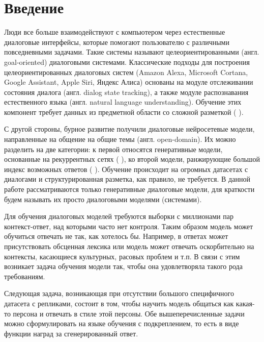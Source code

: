 \documentclass[12pt,a4paper]{amsart}
\begin{document}
\pagebreak
\section{Введение}

Люди все больше взаимодействуют с компьютером через естественные диалоговые интерфейсы, которые помогают пользователю с различными повседневными задачами. Такие системы называют целеориентированными (англ. goal-oriented) диалоговыми системами. Классические подходы для построения целеориентированных диалоговых систем (Amazon Alexa, Microsoft Cortana, Google Assistant, Apple Siri, Яндекс Алиса) основаны на модуле отслеживании состояния диалога (англ. dialog state tracking), а также модуле распознавания естественного языка (англ. natural language understanding). Обучение этих компонент требует данных из предметной области со сложной разметкой (\cite{DBLP:journals/corr/ZhaoE16} \cite{DBLP:journals/corr/MrksicSTGSVWY15} \cite{DBLP:journals/corr/Perez16}).

С другой стороны, бурное развитие получили диалоговые нейросетевые модели, направленные на общение на общие темы (англ. open-domain). Их можно разделить на две категории: к первой относятся генеративные модели, основанные на рекуррентных сетях (\cite{DBLP:journals/corr/VinyalsL15} \cite{DBLP:journals/corr/LiGBGD16} \cite{DBLP:journals/corr/SerbanSBCP15}), ко второй модели, ранжирующие большой индекс возможных ответов (\cite{semantic-parsing-for-single-relation-question-answering} \cite{learning-deep-structured-semantic-models-for-web-search-using-clickthrough-data}). Обучение происходит на огромных датасетах с диалогами и структурированная разметка, как правило, не требуется. В данной работе рассматриваются только генеративные диалоговые модели, для краткости будем называть их просто диалоговыми моделями (системами).

Для обучения диалоговых моделей требуются выборки с миллионами пар контекст-ответ, над которыми часто нет контроля. Таким образом модель может обучиться отвечать не так, как хотелось бы. Например, в ответах может присутствовать обсценная лексика или модель может отвечать оскорбительно на контексты, касающиеся культурных, расовых проблем и т.п. В связи с этим возникает задача обучения модели так, чтобы она удовлетворяла такого рода требованиям.

Следующая задача, возникающая при отсутствии большого специфичного датасета с репликами, состоит в том, чтобы научить модель общаться как какая-то персона и отвечать в стиле этой персоны. Обе вышеперечисленные задачи можно сформулировать на языке обучения с подкреплением, то есть в виде функции наград за сгенерированный ответ.
\end{document}
